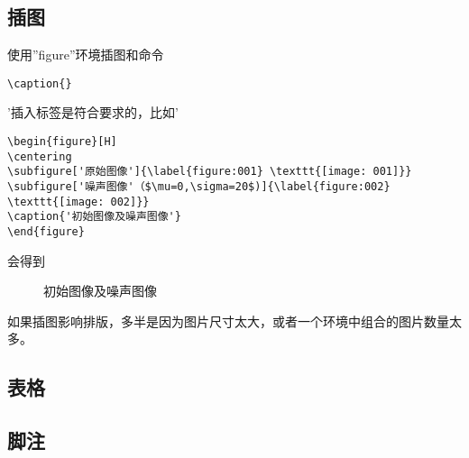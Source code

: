 \subsection{插图}
\label{ch2_3}
使用''figure''环境插图和命令
\begin{lstlisting}[frame=single,escapeinside='']
\caption{}
\end{lstlisting}
'插入标签是符合要求的，比如'
\begin{lstlisting}[frame=single]
\begin{figure}[H]
\centering
\subfigure['原始图像']{\label{figure:001} \texttt{[image: 001]}}
\subfigure['噪声图像'（$\mu=0,\sigma=20$)]{\label{figure:002} \texttt{[image: 002]}}
\caption{'初始图像及噪声图像'}
\end{figure}
\end{lstlisting}
会得到
\begin{figure}[H]
\centering
\subfigure[原始图像]{\label{figure:001} \texttt{[image: 001]}}
\subfigure[噪声图像（$\mu=0,\sigma=20$)]{\label{figure:002} \texttt{[image: 002]}}
\caption{初始图像及噪声图像}
\end{figure}
如果插图影响排版，多半是因为图片尺寸太大，或者一个环境中组合的图片数量太多。\par

\subsection{表格}
\label{ch2_4}

\subsection{脚注}
\label{ch2_5}